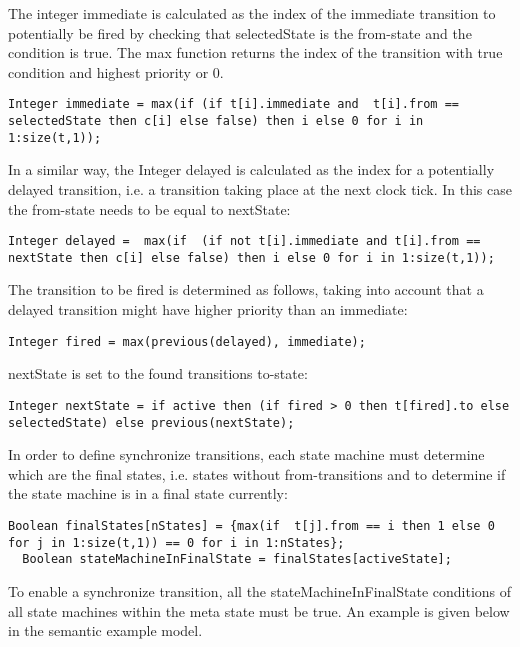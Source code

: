 The integer immediate is calculated as the index of the immediate
transition to potentially be fired by checking that selectedState is the
from-state and the condition is true. The max function returns the index
of the transition with true condition and highest priority or 0.

\begin{lstlisting}[language=modelica]
  Integer immediate = max(if (if t[i].immediate and  t[i].from == selectedState then c[i] else false) then i else 0 for i in 1:size(t,1));
\end{lstlisting}
In a similar way, the Integer delayed is calculated as the index for a
potentially delayed transition, i.e. a transition taking place at the
next clock tick. In this case the from-state needs to be equal to
nextState:

\begin{lstlisting}[language=modelica]
  Integer delayed =  max(if  (if not t[i].immediate and t[i].from == nextState then c[i] else false) then i else 0 for i in 1:size(t,1));
\end{lstlisting}
The transition to be fired is determined as follows, taking into account
that a delayed transition might have higher priority than an immediate:

\begin{lstlisting}[language=modelica]
  Integer fired = max(previous(delayed), immediate);
\end{lstlisting}
nextState is set to the found transitions to-state:

\begin{lstlisting}[language=modelica]
  Integer nextState = if active then (if fired > 0 then t[fired].to else selectedState) else previous(nextState);
\end{lstlisting}
In order to define synchronize transitions, each state machine must
determine which are the final states, i.e. states without
from-transitions and to determine if the state machine is in a final
state currently:

\begin{lstlisting}[language=modelica]
  Boolean finalStates[nStates] = {max(if  t[j].from == i then 1 else 0 for j in 1:size(t,1)) == 0 for i in 1:nStates};
  Boolean stateMachineInFinalState = finalStates[activeState];
\end{lstlisting}
To enable a synchronize transition, all the stateMachineInFinalState
conditions of all state machines within the meta state must be true. An
example is given below in the semantic example model.

